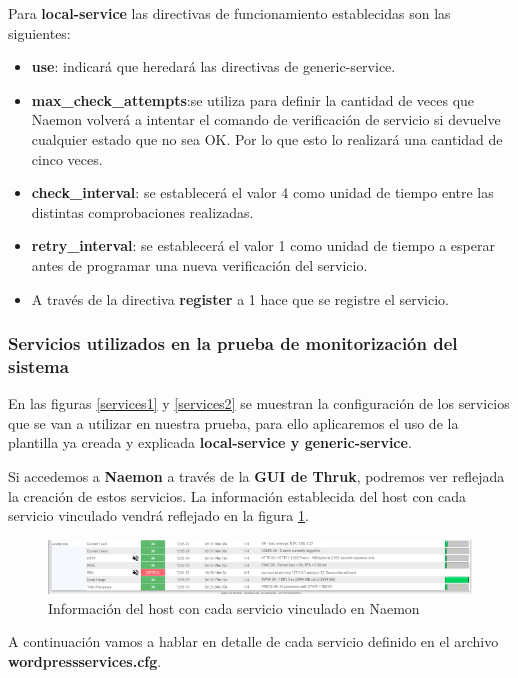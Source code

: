 \newpage
Para \textbf{local-service} las directivas de funcionamiento establecidas son las siguientes:
\begin{itemize}	
	\item \textbf{use}: indicará que heredará las directivas de generic-service.
	\item \textbf{max\_check\_attempts}:se utiliza para definir la cantidad de veces que Naemon volverá a intentar el comando de verificación de servicio si devuelve cualquier estado que no sea OK. 	Por lo que esto lo realizará una cantidad de cinco veces.
	\item \textbf{check\_interval}: se establecerá el valor 4 como unidad de tiempo entre las distintas comprobaciones realizadas.
	\item \textbf{retry\_interval}: se establecerá el valor 1 como unidad de tiempo a esperar antes de programar una nueva verificación del servicio.
	\item A través de la directiva \textbf{register} a 1 hace que se registre el servicio.

\end{itemize}
\subsubsection{Servicios utilizados en la prueba de monitorización del sistema}

En las figuras \ref{services1} y \ref{services2} se muestran la configuración de los servicios que se van a utilizar en nuestra prueba, para ello aplicaremos el uso de la plantilla ya creada y explicada \textbf{local-service y generic-service}.

Si accedemos a \textbf{Naemon} a través de la \textbf{GUI de Thruk}, podremos ver reflejada la creación de estos servicios. La información establecida del host con cada servicio vinculado vendrá reflejado en la figura \ref{wordpressservices}.
\begin{figure}[H]
	\centering
	
	\includegraphics[scale=0.4]{imagenes/wordpress/analisis_naemon/wordpress_services.png}
	\caption{Información del host con cada servicio vinculado en Naemon} \label{wordpressservices}
\end{figure}
A continuación vamos a hablar en detalle de cada servicio definido en el archivo \textbf{wordpressservices.cfg}. 
\newpage
